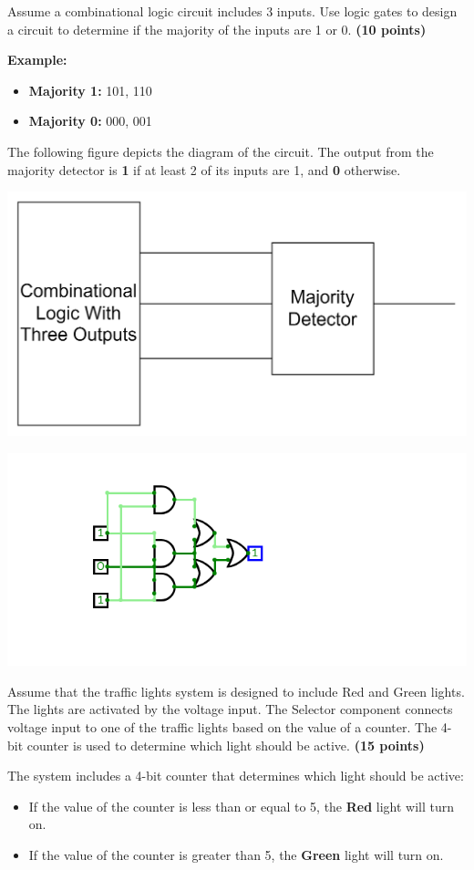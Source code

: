 \documentclass[10pt,answers]{exam}
\newcommand{\qpoints}[1]{\hfill \textbf{(#1 points)}}
\begin{document}
\begin{questions}
\question Assume a combinational logic circuit includes 3 inputs. Use logic gates to design a circuit to determine if the majority of the inputs are 1 or 0. \qpoints{10}

\textbf{Example:} 
\begin{itemize}
    \item \textbf{Majority 1:} 101, 110
    \item \textbf{Majority 0:} 000, 001
\end{itemize}

The following figure depicts the diagram of the circuit. The output from the majority detector is \textbf{1} if at least 2 of its inputs are 1, and \textbf{0} otherwise.

\begin{center}
\includegraphics[width=0.6\linewidth]{images/ex2.png}
\end{center}


\begin{solution}
    \begin{center}
		\includegraphics[width=0.6\linewidth]{ex2.png}
		\end{center}
		
\end{solution}


\question Assume that the traffic lights system is designed to include Red and Green lights. The lights are activated by the voltage input. The Selector component connects voltage input to one of the traffic lights based on the value of a counter. The 4-bit counter is used to determine which light should be active. \qpoints{15}

The system includes a 4-bit counter that determines which light should be active:
\begin{itemize}
    \item If the value of the counter is less than or equal to 5, the \textbf{Red} light will turn on.
    \item If the value of the counter is greater than 5, the \textbf{Green} light will turn on.
\end{itemize}


\end{questions}
\end{document}
